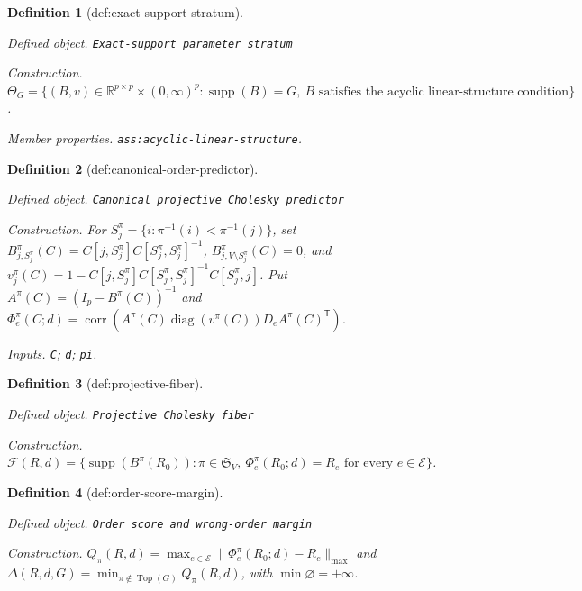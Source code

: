 \documentclass{article}
\newtheorem{definition}{Definition}
\begin{document}
\begin{definition}[def:exact-support-stratum]\label{def:exact-support-stratum}
\par\smallskip\noindent\emph{Defined object.} \texttt{Exact-\allowbreak{}support parameter stratum}
\par\smallskip\noindent\emph{Construction.} \(\Theta_G=\{(B,v)\in\mathbb R^{p\times p}\times(0,\infty)^p:\operatorname{supp}(B)=G,\ B\text{ satisfies the acyclic linear-structure condition}\}\).
\par\smallskip\noindent\emph{Member properties.} \texttt{ass:\allowbreak{}acyclic-\allowbreak{}linear-\allowbreak{}structure}.
\end{definition}

\begin{definition}[def:canonical-order-predictor]\label{def:canonical-order-predictor}
\par\smallskip\noindent\emph{Defined object.} \texttt{Canonical projective Cholesky predictor}
\par\smallskip\noindent\emph{Construction.} For \(S_j^{\pi}=\{i:\pi^{-1}(i)<\pi^{-1}(j)\}\), set \(B_{j,S_j^{\pi}}^{\pi}(C)=C[j,S_j^{\pi}]C[S_j^{\pi},S_j^{\pi}]^{-1}\), \(B_{j,V\setminus S_j^{\pi}}^{\pi}(C)=0\), and \(v_j^{\pi}(C)=1-C[j,S_j^{\pi}]C[S_j^{\pi},S_j^{\pi}]^{-1}C[S_j^{\pi},j]\). Put \(A^{\pi}(C)=(I_p-B^{\pi}(C))^{-1}\) and \(\Phi_e^{\pi}(C;d)=\operatorname{corr}(A^{\pi}(C)\operatorname{diag}(v^{\pi}(C))D_eA^{\pi}(C)^{\mathsf T})\).
\par\smallskip\noindent\emph{Inputs.} \texttt{C}; \texttt{d}; \texttt{pi}.
\end{definition}

\begin{definition}[def:projective-fiber]\label{def:projective-fiber}
\par\smallskip\noindent\emph{Defined object.} \texttt{Projective Cholesky fiber}
\par\smallskip\noindent\emph{Construction.} \(\mathcal F(R,d)=\{\operatorname{supp}(B^{\pi}(R_0)):\pi\in\mathfrak S_V,\ \Phi_e^{\pi}(R_0;d)=R_e\text{ for every }e\in\mathcal E\}\).
\end{definition}

\begin{definition}[def:order-score-margin]\label{def:order-score-margin}
\par\smallskip\noindent\emph{Defined object.} \texttt{Order score and wrong-\allowbreak{}order margin}
\par\smallskip\noindent\emph{Construction.} \(Q_{\pi}(R,d)=\max_{e\in\mathcal E}\lVert\Phi_e^{\pi}(R_0;d)-R_e\rVert_{\max}\) and \(\Delta(R,d,G)=\min_{\pi\notin\operatorname{Top}(G)}Q_{\pi}(R,d)\), with \(\min\varnothing=+\infty\).
\end{definition}
\end{document}
